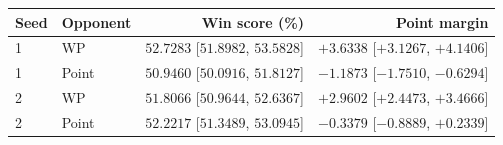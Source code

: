\begin{tabular}{llrr}
\toprule
Seed & Opponent & Win score (\%) & Point margin \\
\midrule
1 & WP & $52.7283$ [$51.8982$, $53.5828$] & $+3.6338$ [$+3.1267$, $+4.1406$] \\
1 & Point & $50.9460$ [$50.0916$, $51.8127$] & $-1.1873$ [$-1.7510$, $-0.6294$] \\
2 & WP & $51.8066$ [$50.9644$, $52.6367$] & $+2.9602$ [$+2.4473$, $+3.4666$] \\
2 & Point & $52.2217$ [$51.3489$, $53.0945$] & $-0.3379$ [$-0.8889$, $+0.2339$] \\
\bottomrule
\end{tabular}
